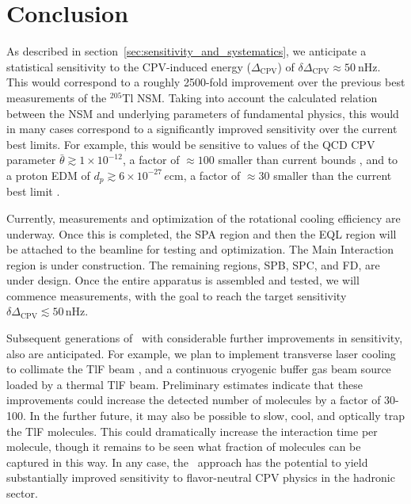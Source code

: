 \section{Conclusion}
As described in section~\ref{sec:sensitivity_and_systematics}, we anticipate a statistical sensitivity to the CPV-induced energy ($\Delta_\mathrm{CPV}$) of $\delta \Delta_\mathrm{CPV} \approx  50~$nHz.  This would correspond to a roughly 2500-fold improvement over the previous best measurements of the $^{205}$Tl NSM.
Taking into account the calculated relation between the NSM and underlying parameters of fundamental physics, this would in many cases correspond to a significantly improved sensitivity over the current best limits.  For example, this would be sensitive to values of the QCD CPV parameter $\bar{\theta} \gtrsim 1 \times 10^{-12}$, a factor of $\approx 100$ smaller than current bounds \cite{abel2020measurement,graner2016reduced}, and to a proton EDM of $d_p \gtrsim 6\times 10^{-27}\,e$cm, a factor of $\approx 30$ smaller than the current best limit \cite{graner2016reduced}.

Currently, measurements and optimization of the rotational cooling efficiency are underway. Once this is completed, the SPA region and then the EQL region will be attached to the beamline for testing and optimization. The Main Interaction region is under construction. The remaining regions, SPB, SPC, and FD, are under design. Once the entire apparatus is assembled and tested, we will commence measurements, with the goal to reach the target sensitivity $\delta \Delta_\mathrm{CPV} \lesssim 50\,$nHz.

Subsequent generations of \CENTREX\, with considerable further improvements in sensitivity, also are anticipated.  For example, we plan to implement transverse laser cooling to collimate the TlF beam \cite{norrgard2017hyperfine, hunter2012prospects}, and a continuous cryogenic buffer gas beam source~\cite{Patterson_2007, Patterson_2009, Patterson_2015, PhysRevA.97.032704} loaded by a thermal TlF beam.  Preliminary estimates indicate that these improvements could increase the detected number of molecules by a factor of 30-100. In the further future, it may also be possible to slow, cool, and optically trap the TlF molecules.  This could dramatically increase the interaction time per molecule, though it remains to be seen what fraction of molecules can be captured in this way. In any case, the \CENTREX\ approach has the potential to yield substantially improved sensitivity to flavor-neutral CPV physics in the hadronic sector.

